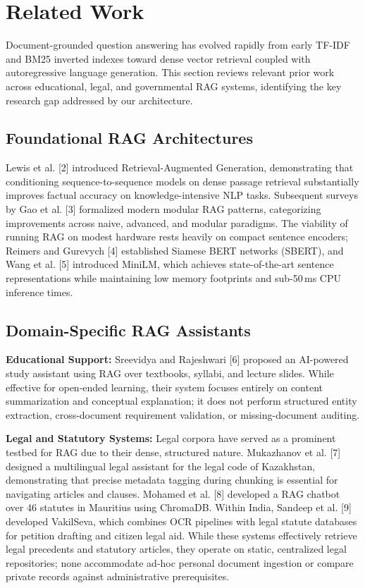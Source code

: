 \documentclass[conference]{IEEEtran}
\begin{document}
\section{Related Work}
Document-grounded question answering has evolved rapidly from early TF-IDF and BM25 inverted indexes toward dense vector retrieval coupled with autoregressive language generation. This section reviews relevant prior work across educational, legal, and governmental RAG systems, identifying the key research gap addressed by our architecture.

\subsection{Foundational RAG Architectures}
Lewis et al. [2] introduced Retrieval-Augmented Generation, demonstrating that conditioning sequence-to-sequence models on dense passage retrieval substantially improves factual accuracy on knowledge-intensive NLP tasks. Subsequent surveys by Gao et al. [3] formalized modern modular RAG patterns, categorizing improvements across naive, advanced, and modular paradigms. The viability of running RAG on modest hardware rests heavily on compact sentence encoders; Reimers and Gurevych [4] established Siamese BERT networks (SBERT), and Wang et al. [5] introduced MiniLM, which achieves state-of-the-art sentence representations while maintaining low memory footprints and sub-50\,ms CPU inference times.

\subsection{Domain-Specific RAG Assistants}
\textbf{Educational Support:} Sreevidya and Rajeshwari [6] proposed an AI-powered study assistant using RAG over textbooks, syllabi, and lecture slides. While effective for open-ended learning, their system focuses entirely on content summarization and conceptual explanation; it does not perform structured entity extraction, cross-document requirement validation, or missing-document auditing.

\textbf{Legal and Statutory Systems:} Legal corpora have served as a prominent testbed for RAG due to their dense, structured nature. Mukazhanov et al. [7] designed a multilingual legal assistant for the legal code of Kazakhstan, demonstrating that precise metadata tagging during chunking is essential for navigating articles and clauses. Mohamed et al. [8] developed a RAG chatbot over 46 statutes in Mauritius using ChromaDB. Within India, Sandeep et al. [9] developed VakilSeva, which combines OCR pipelines with legal statute databases for petition drafting and citizen legal aid. While these systems effectively retrieve legal precedents and statutory articles, they operate on static, centralized legal repositories; none accommodate ad-hoc personal document ingestion or compare private records against administrative prerequisites.
\end{document}
